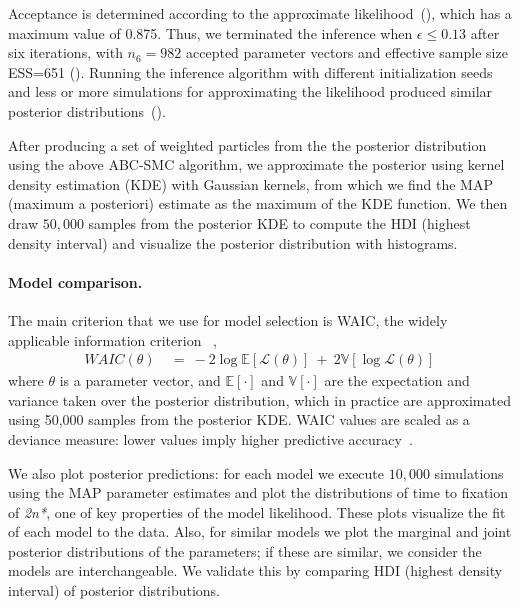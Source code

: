 \documentclass[12pt]{extarticle}
\newcommand{\likelihood}{\mathcal{L}}
\newcommand{\eumt}{\emph{2n*}}
\begin{document}
Acceptance is determined according to the approximate likelihood~(), which has a maximum value of 0.875. Thus, we terminated the inference when $\epsilon \le 0.13$ after six iterations, with $n_6=982$ accepted parameter vectors and effective sample size ESS=651 (). Running the inference algorithm with different initialization seeds and less or more simulations for approximating the likelihood produced similar posterior distributions~().

After producing a set of weighted particles from the the posterior distribution using the above ABC-SMC algorithm, we approximate the posterior using kernel density estimation (KDE) with Gaussian kernels, from which we find the MAP (maximum a posteriori) estimate as the maximum of the KDE function. We then draw $50,000$ samples from the posterior KDE to compute the HDI (highest density interval) and visualize the posterior distribution with histograms.


\paragraph{Model comparison.} The main criterion that we use for model selection is WAIC, the widely applicable information criterion ~\citep{gelman2013bayesian},
\begin{equation} \label{eq:WAIC}
\begin{aligned}
\mathit{WAIC}(\theta) &\ =\ 
-2\log\mathbb{E}[\likelihood(\theta)]\ +\ 2\mathbb{V}[\log\likelihood(\theta)]
\end{aligned}
\end{equation}
where $\theta$ is a parameter vector, and $\mathbb{E}[\cdot]$ and $\mathbb{V}[\cdot]$ are the expectation and variance taken over the posterior distribution, which in practice are approximated using 50,000 samples from the posterior KDE.
WAIC values are scaled as a deviance measure: lower values imply higher predictive accuracy~\citep{Kass1995}.

We also plot posterior predictions: for each model we execute $10,000$ simulations using the MAP parameter estimates and plot the distributions of time to fixation of \eumt, one of key properties of the model likelihood. These plots visualize the fit of each model to the data. 
Also, for similar models we plot the marginal and joint posterior distributions of the parameters; if these are similar, we consider the models are interchangeable. We validate this by comparing HDI (highest density interval) of posterior distributions.
 
\end{document}
